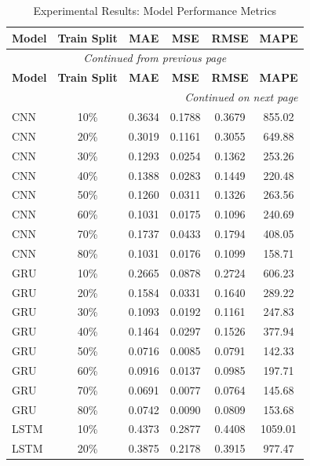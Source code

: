 
\begin{longtable}{l c c c c c}
    \toprule
    \textbf{Model} & \textbf{Train Split} & \textbf{MAE} & \textbf{MSE} & \textbf{RMSE} & \textbf{MAPE} \\
    \midrule
    \endfirsthead

    \multicolumn{6}{c}{{\textit{Continued from previous page}}} \\
    \toprule
    \textbf{Model} & \textbf{Train Split} & \textbf{MAE} & \textbf{MSE} & \textbf{RMSE} & \textbf{MAPE} \\
    \midrule
    \endhead

    \midrule \multicolumn{6}{r}{{\textit{Continued on next page}}} \\
    \endfoot

    \bottomrule
    \caption{Experimental Results: Model Performance Metrics}
    \label{tab:results_longtable}
    \endlastfoot
        CNN & 10\% & 0.3634 & 0.1788 & 0.3679 & 855.02 \\
        CNN & 20\% & 0.3019 & 0.1161 & 0.3055 & 649.88 \\
        CNN & 30\% & 0.1293 & 0.0254 & 0.1362 & 253.26 \\
        CNN & 40\% & 0.1388 & 0.0283 & 0.1449 & 220.48 \\
        CNN & 50\% & 0.1260 & 0.0311 & 0.1326 & 263.56 \\
        CNN & 60\% & 0.1031 & 0.0175 & 0.1096 & 240.69 \\
        CNN & 70\% & 0.1737 & 0.0433 & 0.1794 & 408.05 \\
        CNN & 80\% & 0.1031 & 0.0176 & 0.1099 & 158.71 \\
        GRU & 10\% & 0.2665 & 0.0878 & 0.2724 & 606.23 \\
        GRU & 20\% & 0.1584 & 0.0331 & 0.1640 & 289.22 \\
        GRU & 30\% & 0.1093 & 0.0192 & 0.1161 & 247.83 \\
        GRU & 40\% & 0.1464 & 0.0297 & 0.1526 & 377.94 \\
        GRU & 50\% & 0.0716 & 0.0085 & 0.0791 & 142.33 \\
        GRU & 60\% & 0.0916 & 0.0137 & 0.0985 & 197.71 \\
        GRU & 70\% & 0.0691 & 0.0077 & 0.0764 & 145.68 \\
        GRU & 80\% & 0.0742 & 0.0090 & 0.0809 & 153.68 \\
        LSTM & 10\% & 0.4373 & 0.2877 & 0.4408 & 1059.01 \\
        LSTM & 20\% & 0.3875 & 0.2178 & 0.3915 & 977.47 \\

\end{longtable}
